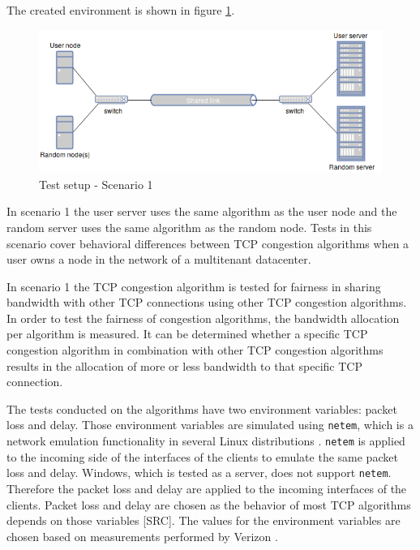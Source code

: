 \documentclass{article}
\begin{document}
	The created environment is shown in figure \ref{fig:setup1}.

	\begin{figure}[H] 
		\centering
  			\includegraphics[scale=0.5]{figs/setup2.png}
  			\caption{Test setup - Scenario 1}
  		\label{fig:setup1}
	\end{figure}
	
	In scenario 1 the user server uses the same algorithm as the user node and the random server uses the same algorithm as the random node. Tests in this scenario cover behavioral differences between TCP congestion algorithms when a user owns a node in the network of a multitenant datacenter.
	
	In scenario 1 the TCP congestion algorithm is tested for fairness in sharing bandwidth with other TCP connections using other TCP congestion algorithms. In order to test the fairness of congestion algorithms, the bandwidth allocation per algorithm is measured. It can be determined whether a specific TCP congestion algorithm in combination with other TCP congestion algorithms results in the allocation of more or less bandwidth to that specific TCP connection.

The tests conducted on the algorithms have two environment variables: packet loss and delay. Those environment variables are simulated using \texttt{netem}, which is a network emulation functionality in several Linux distributions \cite{linux-netem}. \texttt{netem} is applied to the incoming side of the interfaces of the clients to emulate the same packet loss and delay. Windows, which is tested as a server, does not support \texttt{netem}. Therefore the packet loss and delay are applied to the incoming interfaces of the clients. Packet loss and delay are chosen as the behavior of most TCP algorithms depends on those variables [SRC]. The values for the environment variables are chosen based on measurements performed by Verizon \cite{verizon-latency}.

\end{document}
